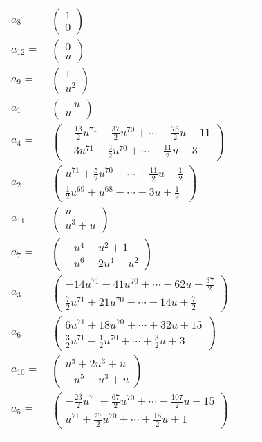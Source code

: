 \documentclass[1p]{elsarticle_modified}
\theoremstyle{definition}
\begin{document}
\begin{tabular}{m{7pt} m{180pt} m{7pt} m{180pt} }
\flushright $a_{8}=$&$\begin{pmatrix}1\\0\end{pmatrix}$ \\
\flushright $a_{12}=$&$\begin{pmatrix}0\\u\end{pmatrix}$ \\
\flushright $a_{9}=$&$\begin{pmatrix}1\\u^2\end{pmatrix}$ \\
\flushright $a_{1}=$&$\begin{pmatrix}- u\\u\end{pmatrix}$ \\
\flushright $a_{4}=$&$\begin{pmatrix}-\frac{13}{2} u^{71}-\frac{37}{2} u^{70}+\cdots-\frac{73}{2} u-11\\-3 u^{71}-\frac{3}{2} u^{70}+\cdots-\frac{11}{2} u-3\end{pmatrix}$ \\
\flushright $a_{2}=$&$\begin{pmatrix}u^{71}+\frac{5}{2} u^{70}+\cdots+\frac{11}{2} u+\frac{1}{2}\\\frac{1}{2} u^{69}+u^{68}+\cdots+3 u+\frac{1}{2}\end{pmatrix}$ \\
\flushright $a_{11}=$&$\begin{pmatrix}u\\u^3+u\end{pmatrix}$ \\
\flushright $a_{7}=$&$\begin{pmatrix}- u^4- u^2+1\\- u^6-2 u^4- u^2\end{pmatrix}$ \\
\flushright $a_{3}=$&$\begin{pmatrix}-14 u^{71}-41 u^{70}+\cdots-62 u-\frac{37}{2}\\\frac{7}{2} u^{71}+21 u^{70}+\cdots+14 u+\frac{7}{2}\end{pmatrix}$ \\
\flushright $a_{6}=$&$\begin{pmatrix}6 u^{71}+18 u^{70}+\cdots+32 u+15\\\frac{3}{2} u^{71}-\frac{1}{2} u^{70}+\cdots+\frac{3}{2} u+3\end{pmatrix}$ \\
\flushright $a_{10}=$&$\begin{pmatrix}u^5+2 u^3+u\\- u^5- u^3+u\end{pmatrix}$ \\
\flushright $a_{5}=$&$\begin{pmatrix}-\frac{23}{2} u^{71}-\frac{67}{2} u^{70}+\cdots-\frac{107}{2} u-15\\u^{71}+\frac{27}{2} u^{70}+\cdots+\frac{15}{2} u+1\end{pmatrix}$\\&\end{tabular}
\end{document}
